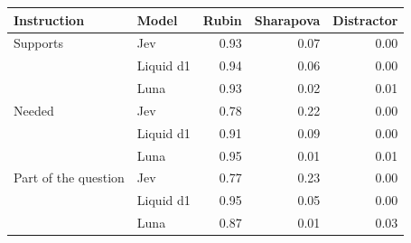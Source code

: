 \begin{tabular}{llrrr}
\toprule
Instruction & Model & Rubin & Sharapova & Distractor \\
\midrule
Supports & Jev & 0.93 & 0.07 & 0.00 \\
 & Liquid d1 & 0.94 & 0.06 & 0.00 \\
 & Luna & 0.93 & 0.02 & 0.01 \\
\midrule
Needed & Jev & 0.78 & 0.22 & 0.00 \\
 & Liquid d1 & 0.91 & 0.09 & 0.00 \\
 & Luna & 0.95 & 0.01 & 0.01 \\
\midrule
Part of the question & Jev & 0.77 & 0.23 & 0.00 \\
 & Liquid d1 & 0.95 & 0.05 & 0.00 \\
 & Luna & 0.87 & 0.01 & 0.03 \\
\bottomrule
\end{tabular}%
